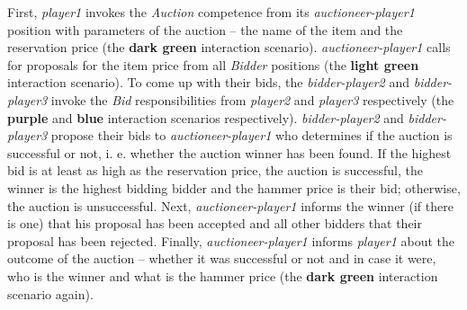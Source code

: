 First, \textit{player1} invokes the \textit{Auction} competence from its \textit{auctioneer-player1} position with parameters of the auction -- the name of the item and the reservation price (the \textbf{dark green} interaction scenario).
\textit{auctioneer-player1} calls for proposals for the item price from all \textit{Bidder} positions (the \textbf{light green} interaction scenario).
To come up with their bids, the \textit{bidder-player2} and \textit{bidder-player3} invoke the \textit{Bid} responsibilities from \textit{player2} and \textit{player3} respectively (the \textbf{purple} and \textbf{blue} interaction scenarios respectively).
\textit{bidder-player2} and \textit{bidder-player3} propose their bids to \textit{auctioneer-player1} who determines if the auction is successful or not, i. e. whether the auction winner has been found.
If the highest bid is at least as high as the reservation price, the auction is successful, the winner is the highest bidding bidder and the hammer price is their bid; otherwise, the auction is unsuccessful.
Next, \textit{auctioneer-player1} informs the winner (if there is one) that his proposal has been accepted and all other bidders that their proposal has been rejected.
Finally, \textit{auctioneer-player1} informs \textit{player1} about the outcome of the auction -- whether it was successful or not and in case it were, who is the winner and what is the hammer price (the \textbf{dark green} interaction scenario again).